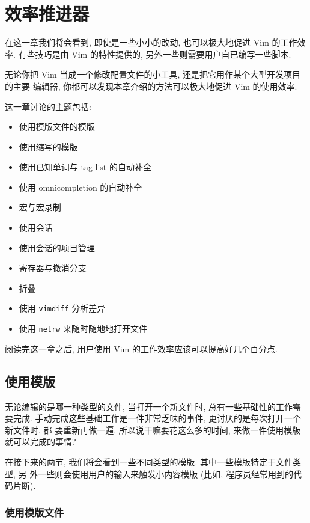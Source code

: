 \chapter{效率推进器}
\label{chap:production_boosters}

在这一章我们将会看到, 即使是一些小小的改动, 也可以极大地促进 Vim 的工作效率.
有些技巧是由 Vim 的特性提供的, 另外一些则需要用户自已编写一些脚本.

无论你把 Vim 当成一个修改配置文件的小工具, 还是把它用作某个大型开发项目的主要
编辑器, 你都可以发现本章介绍的方法可以极大地促进 Vim 的使用效率.

这一章讨论的主题包括:
\begin{itemize}
    \item 使用模版文件的模版
    \item 使用缩写的模版
    \item 使用已知单词与 tag list 的自动补全
    \item 使用 omnicompletion 的自动补全
    \item 宏与宏录制
    \item 使用会话
    \item 使用会话的项目管理
    \item 寄存器与撤消分支
    \item 折叠
    \item 使用 \texttt{vimdiff} 分析差异
    \item 使用 \texttt{netrw} 来随时随地地打开文件
\end{itemize}

阅读完这一章之后, 用户使用 Vim 的工作效率应该可以提高好几个百分点.

\section{使用模版}
\label{sec:using_templates}

无论编辑的是哪一种类型的文件, 当打开一个新文件时, 总有一些基础性的工作需要完成.
手动完成这些基础工作是一件非常乏味的事件, 更讨厌的是每次打开一个新文件时, 都
要重新再做一遍. 所以说干嘛要花这么多的时间, 来做一件使用模版就可以完成的事情?

在接下来的两节, 我们将会看到一些不同类型的模版. 其中一些模版特定于文件类型, 另
外一些则会使用用户的输入来触发小内容模版 (比如, 程序员经常用到的代码片断).

\subsection{使用模版文件}
\label{subsec:using_template_files}

